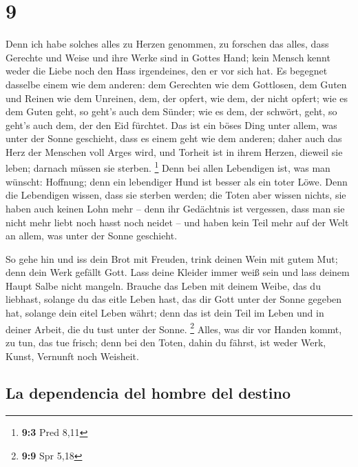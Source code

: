 \hypertarget{section-8}{%
\section{9}\label{section-8}}

 Denn ich habe solches alles zu Herzen genommen, zu
forschen das alles, dass Gerechte und Weise und ihre Werke sind in
Gottes Hand; kein Mensch kennt weder die Liebe noch den Hass
irgendeines, den er vor sich hat.  Es begegnet dasselbe
einem wie dem anderen: dem Gerechten wie dem Gottlosen, dem Guten und
Reinen wie dem Unreinen, dem, der opfert, wie dem, der nicht opfert; wie
es dem Guten geht, so geht's auch dem Sünder; wie es dem, der schwört,
geht, so geht's auch dem, der den Eid fürchtet.  Das ist
ein böses Ding unter allem, was unter der Sonne geschieht, dass es einem
geht wie dem anderen; daher auch das Herz der Menschen voll Arges wird,
und Torheit ist in ihrem Herzen, dieweil sie leben; darnach müssen sie
sterben. \footnote{\textbf{9:3} Pred 8,11}  Denn bei allen
Lebendigen ist, was man wünscht: Hoffnung; denn ein lebendiger Hund ist
besser als ein toter Löwe.  Denn die Lebendigen wissen,
dass sie sterben werden; die Toten aber wissen nichts, sie haben auch
keinen Lohn mehr -- denn ihr Gedächtnis ist vergessen, 
dass man sie nicht mehr liebt noch hasst noch neidet -- und haben kein
Teil mehr auf der Welt an allem, was unter der Sonne geschieht.

 So gehe hin und iss dein Brot mit Freuden, trink deinen
Wein mit gutem Mut; denn dein Werk gefällt Gott.  Lass
deine Kleider immer weiß sein und lass deinem Haupt Salbe nicht mangeln.
 Brauche das Leben mit deinem Weibe, das du liebhast,
solange du das eitle Leben hast, das dir Gott unter der Sonne gegeben
hat, solange dein eitel Leben währt; denn das ist dein Teil im Leben und
in deiner Arbeit, die du tust unter der Sonne. \footnote{\textbf{9:9}
  Spr 5,18}  Alles, was dir vor Handen kommt, zu tun, das
tue frisch; denn bei den Toten, dahin du fährst, ist weder Werk, Kunst,
Vernunft noch Weisheit.

\hypertarget{la-dependencia-del-hombre-del-destino}{%
\subsection{La dependencia del hombre del
destino}\label{la-dependencia-del-hombre-del-destino}}

